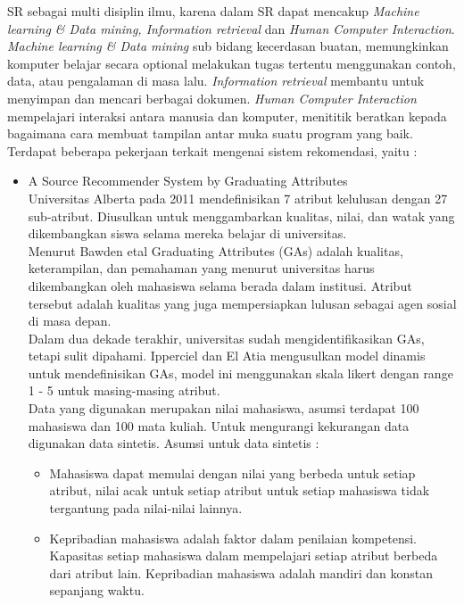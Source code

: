 \documentclass[a4paper,twoside]{article}
\begin{document}
\begin{enumerate}
		SR sebagai multi disiplin ilmu, karena dalam SR dapat mencakup \textit{Machine learning \& Data mining, Information retrieval} dan \textit{Human Computer Interaction}. \textit{Machine learning \& Data mining} sub bidang kecerdasan buatan, memungkinkan komputer belajar secara optional melakukan tugas tertentu menggunakan contoh, data, atau pengalaman di masa lalu. \textit{Information retrieval} membantu untuk menyimpan dan mencari berbagai dokumen. \textit{Human Computer Interaction} mempelajari interaksi antara manusia dan komputer, menititik beratkan kepada bagaimana cara membuat tampilan antar muka suatu program yang baik.\\
		
		Terdapat beberapa pekerjaan terkait mengenai sistem rekomendasi, yaitu :
		\begin{itemize}
			\item A Source Recommender System by Graduating Attributes \\
				Universitas Alberta pada 2011 mendefinisikan 7 atribut kelulusan dengan 27 sub-atribut. Diusulkan untuk menggambarkan kualitas, nilai, dan watak yang dikembangkan siswa selama mereka belajar di universitas.    \\
				Menurut Bawden etal Graduating Attributes (GAs) adalah kualitas, keterampilan, dan pemahaman yang menurut universitas harus dikembangkan oleh mahasiswa selama berada dalam institusi.  Atribut tersebut adalah kualitas yang juga mempersiapkan lulusan sebagai agen sosial di masa depan.\\
				Dalam dua dekade terakhir, universitas sudah mengidentifikasikan GAs, tetapi sulit dipahami. Ipperciel dan El Atia mengusulkan model dinamis untuk mendefinisikan GAs, model ini menggunakan skala likert dengan range 1 - 5 untuk masing-masing atribut.\\
				Data yang digunakan merupakan nilai mahasiswa, asumsi terdapat 100 mahasiswa dan 100 mata kuliah. Untuk mengurangi kekurangan data digunakan data sintetis. Asumsi untuk data sintetis :
				\begin{itemize}
				\item Mahasiswa dapat memulai dengan nilai yang berbeda untuk setiap atribut, nilai acak untuk setiap atribut untuk setiap mahasiswa tidak tergantung pada nilai-nilai lainnya.
				\item Kepribadian mahasiswa adalah faktor dalam penilaian kompetensi. Kapasitas setiap mahasiswa dalam mempelajari setiap atribut berbeda dari atribut lain. Kepribadian mahasiswa adalah mandiri dan konstan sepanjang waktu.

\end{itemize}
\end{itemize}
\end{enumerate}
\end{document}
